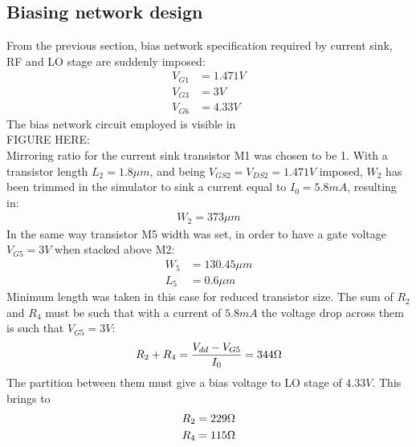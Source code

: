 \subsection{Biasing network design}                                              
From the previous section, bias network specification required by current sink, RF and LO stage are suddenly imposed:
\begin{align}                                                                    
	V_{G1}&=1.471 V \nonumber \\                                                    
	V_{G3}&=3 V \nonumber \\                                                        
	V_{G6}&=4.33 V \nonumber                                                        
\end{align}                                                                      
The bias network circuit employed is visible in \\FIGURE HERE:\\                 
Mirroring ratio for the current sink transistor M1 was chosen to be 1. With a transistor length \(L_2 = 1.8\mu m\), and being \(V_{GS2}=V_{DS2}=1.471V\) imposed, \(W_2\) has been trimmed in the simulator to sink a current equal to \(I_0=5.8mA\), resulting in:
\begin{align}                                                                    
	W_2=373\mu m\nonumber                                                           
\end{align}                                                                      
In the same way transistor M5 width was set, in order to have a gate voltage \(V_{G5}=3V\) when stacked above M2:
\begin{align}
	W_5&=130.45\mu m \nonumber\\
	L_5&=0.6\mu m \nonumber
\end{align}
Minimum length was taken in this case for reduced transistor size.
The sum of \(R_2\) and \(R_4\) must be such that with a current of \(5.8mA\) the voltage drop across them is such that \(V_{G5}=3V\):
\begin{align}
	R_2+R_4=\frac{V_{dd}-V_{G5}}{I_0} = 344\ohm \nonumber
\end{align}
The partition between them must give a bias voltage to LO stage of \(4.33V\). This brings to
\begin{align}
	R_2=229\ohm\nonumber\\
	R_4=115\ohm\nonumber
\end{align}

